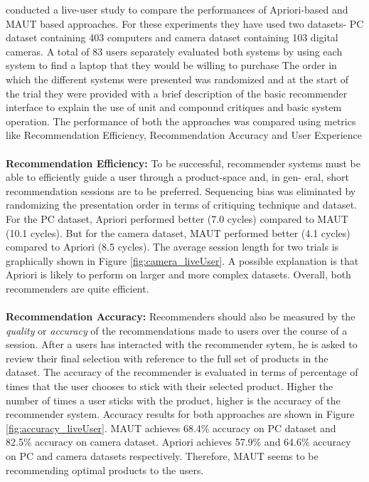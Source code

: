 \cite{liveUserStudy} conducted a live-user study to compare the performances of Apriori-based and MAUT based approaches.
For these experiments they have used two datasets- PC dataset containing 403 computers and camera dataset containing 103 digital cameras.
A total of 83 users separately evaluated both systems by using each system to find a laptop that they would be willing to purchase
The order in which the different systems were presented was randomized and at the start of the trial they were provided with a brief description of the basic recommender interface to explain the use of unit and compound critiques and basic system operation.
The performance of both the approaches was compared using metrics like Recommendation Efficiency, Recommendation Accuracy and User Experience\\
\\
\textbf{Recommendation Efficiency:} To be successful, recommender systems must be able to efficiently guide a user through a product-space and, in gen- eral, short recommendation sessions are to be preferred.
Sequencing bias was eliminated by randomizing the presentation order in terms of critiquing technique and dataset.
For the PC dataset, Apriori performed better (7.0 cycles) compared to MAUT (10.1 cycles).
But for the camera dataset, MAUT performed better (4.1 cycles) compared to Apriori (8.5 cycles).
The average session length for two trials is graphically shown in Figure \ref{fig:camera_liveUser}.
A possible explanation is that Apriori is likely to perform on larger and more complex datasets.
Overall, both recommenders are quite efficient.\\
\\
\textbf{Recommendation Accuracy:} 
Recommenders should also be measured by the \textit{quality} or \textit{accuracy} of the recommendations made to users over the course of a session. 
After a users has interacted with the recommender sytem, he is asked to review their final selection with reference to the full set of products in the dataset.
The accuracy of the recommender is evaluated in terms of percentage of times that the user chooses to stick with their selected product.
Higher the number of times a user sticks with the product, higher is the accuracy of the recommender system.
Accuracy results for both approaches are shown in Figure \ref{fig:accuracy_liveUser}.
MAUT achieves 68.4\% accuracy on PC dataset and 82.5\% accuracy on camera dataset.
Apriori achieves 57.9\% and 64.6\% accuracy on PC and camera datasets respectively.
Therefore, MAUT seems to be recommending optimal products to the users. \\

